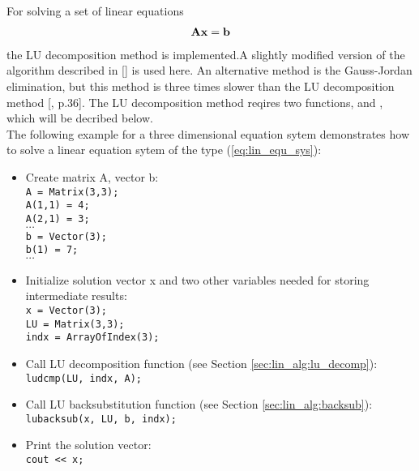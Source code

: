 For solving a set of linear equations 
\begin{eqnarray}
\label{eq:lin_equ_sys}
{\bf A} {\bf x} = {\bf b}
\end{eqnarray}
the LU decomposition method is implemented.A slightly modified version
of the algorithm described in
[\cite{numerical_recipes_C:97}] is used here. An alternative method
is the Gauss-Jordan elimination, but this method is three times
slower than the LU decomposition method
[\cite{numerical_recipes_C:97}, p.36]. The LU decomposition method
reqires two functions,  and ,
which will be decribed below.
\vspace{0.5cm}\\
The following example for a three dimensional equation sytem 
demonstrates how to solve a linear
equation sytem of the type
(\ref{eq:lin_equ_sys}):
\begin{itemize}
\item Create matrix A, vector b: \\
  \verb|A = Matrix(3,3);| \\
  \verb|A(1,1) = 4;|\\
  \verb|A(2,1) = 3;|\\
  $\cdots$\\
  \verb|b = Vector(3);|\\
  \verb|b(1) = 7;|\\
  $\cdots$
\item Initialize solution vector x and two other variables needed for
  storing intermediate results:\\
  \verb|x = Vector(3);|\\
  \verb|LU = Matrix(3,3);|\\
  \verb|indx = ArrayOfIndex(3);|
\item Call LU decomposition function (see Section \ref{sec:lin_alg:lu_decomp}): \\
  \verb|ludcmp(LU, indx, A);|
\item Call LU backsubstitution function (see Section \ref{sec:lin_alg:backsub}): \\
  \verb|lubacksub(x, LU, b, indx);|
\item Print the solution vector:\\
  \verb|cout << x;|
\end{itemize}

\label{sec:lin_alg:lu_decomp}

